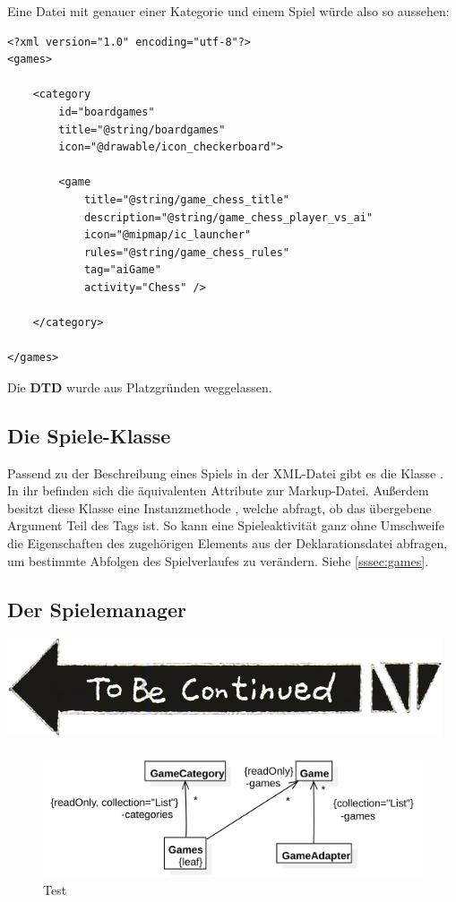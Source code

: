 Eine Datei mit genauer einer Kategorie und einem Spiel würde also so aussehen:

\begin{lstlisting}
<?xml version="1.0" encoding="utf-8"?>
<games>

    <category
        id="boardgames"
        title="@string/boardgames"
        icon="@drawable/icon_checkerboard">

        <game
            title="@string/game_chess_title"
            description="@string/game_chess_player_vs_ai"
            icon="@mipmap/ic_launcher"
            rules="@string/game_chess_rules"
            tag="aiGame"
            activity="Chess" />

    </category>

</games>
\end{lstlisting}

Die \textbf{DTD} wurde aus Platzgründen weggelassen.

\subsection{Die Spiele-Klasse}

Passend zu der Beschreibung eines Spiels in der XML-Datei gibt es die Klasse
. In ihr befinden sich die äquivalenten Attribute zur Markup-Datei.
Außerdem besitzt diese Klasse eine Instanzmethode , welche abfragt, ob das übergebene Argument Teil des
Tags ist. So kann eine Spieleaktivität ganz ohne Umschweife die Eigenschaften
des zugehörigen Elements aus der Deklarationsdatei abfragen, um bestimmte
Abfolgen des Spielverlaufes zu verändern. Siehe \autoref{sssec:games}.

\subsection{Der Spielemanager}

\includegraphics{resources/tobecontinued}

\begin{figure}[h]
	\centering
	\includegraphics{resources/gamemanager/gamemanager_uml}
	\caption{Test}
	\label{fig:gm_uml}
\end{figure}


